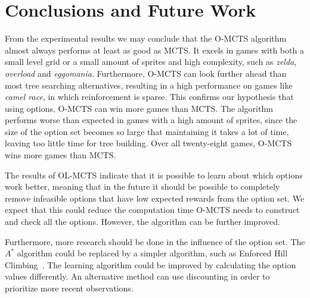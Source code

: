 \section{Conclusions and Future Work}
\label{sec:conclusion}
From the experimental results we may conclude that the O-MCTS algorithm almost
always performs at least as good as MCTS\@. It excels in games with both a small
level grid or a small amount of sprites and high complexity, such as
\textit{zelda}, \textit{overload} and \textit{eggomania}.  Furthermore, O-MCTS
can look further ahead than most tree searching alternatives, resulting in a
high performance on games like \textit{camel race}, in which reinforcement is
sparse. This confirms our hypothesis that using options, O-MCTS can win more
games than MCTS\@. The algorithm performs worse than expected in games with a
high amount of sprites, since the size of the option set becomes so large that
maintaining it takes a lot of time, leaving too little time for tree building.
Over all twenty-eight games, O-MCTS wins more games than MCTS\@.

The results of OL-MCTS indicate that it is possible to learn about which options
work better, meaning that in the future it should be possible to completely
remove infeasible options that have low expected rewards from the option set. We
expect that this could reduce the computation time O-MCTS needs to construct and
check all the options. However, the algorithm can be further improved.

Furthermore, more research should be done in the influence of the option set.
The $A^*$ algorithm could be replaced by a simpler algorithm, such as Enforced
Hill Climbing~\cite{ross2014general}.
The learning algorithm could be improved by calculating the option values
differently. An alternative method can use discounting in order to prioritize
more recent observations.
